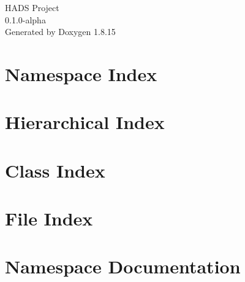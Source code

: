 \let\mypdfximage\pdfximage\def\pdfximage{\immediate\mypdfximage}\documentclass[twoside]{book}
\newcommand{\+}{\discretionary{\mbox{\scriptsize$\hookleftarrow$}}{}{}}
\newcommand{\clearemptydoublepage}{%
  \newpage{\pagestyle{empty}\cleardoublepage}%
}
\begin{document}
\hypersetup{pageanchor=false,
             bookmarksnumbered=true,
             pdfencoding=unicode
            }
\begin{titlepage}
\vspace*{7cm}
\begin{center}%
{\Large H\+A\+DS Project \\[1ex]\large 0.\+1.\+0-\/alpha }\\
\vspace*{1cm}
{\large Generated by Doxygen 1.8.15}\\
\end{center}
\end{titlepage}
\clearemptydoublepage
{}
\tableofcontents
\clearemptydoublepage
{}
\hypersetup{pageanchor=true}

\chapter{Namespace Index}

\chapter{Hierarchical Index}

\chapter{Class Index}

\chapter{File Index}

\chapter{Namespace Documentation}








\end{document}
